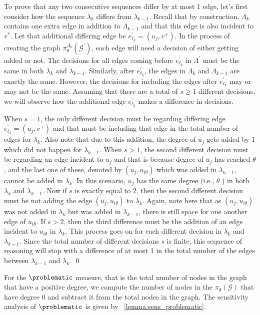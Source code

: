 To prove that any two consecutive sequences differ by at most 1 edge, let's first consider how the sequence $\lambda_k$ differs from $\lambda_{k-1}$. Recall that by construction, $\Lambda_k$ contains one extra edge in addition to $\Lambda_{k-1}$ and that this edge is also incident to $v^*$. Let that additional differing edge be $e_{\ell_k}^\prime = (u_j, v^+)$. In the process of creating the graph $\pi_\theta^{\Lambda_k}(\mathcal{G}^{\prime})$, each edge will need a decision of either getting added or not. The decisions for all edges coming before $e_{\ell_k}^{\prime}$ in $\Lambda^{\prime}$ must be the same in both $\lambda_k$ and $\lambda_{k-1}$. Similarly, after $e_{\ell_k}^{\prime}$, the edges in $\Lambda_k$ and $\Lambda_{k-1}$ are exactly the same. However, the decisions for including the edges after $e_{\ell_k}^{\prime}$ may or may not be the same. Assuming that there are a total of $s \geq 1$ different decisions, we will observe how the additional edge $e_{\ell_k}^{\prime}$ makes a difference in decisions. 


When $s=1$, the only different decision must be regarding differing edge $e_{\ell_k}^\prime = (u_j, v^+)$ and that must be including that edge in the total number of edges for $\lambda_k$. Also note that due to this addition, the degree of $u_j$ gets added by 1 which did not happen for $\lambda_{k-1}$. When $s>1$, the second different decision must be regarding an edge incident to $u_j$ and that is because degree of $u_j$ has reached $\theta$, and the last one of these, denoted by $(u_j, u_{i \theta})$ which was added in $\lambda_{k-1}$, cannot be added in $\lambda_k$. In this scenario, $u_j$ has the same degree (i.e., $\theta$ ) in both $\lambda_k$ and $\lambda_{k-1}$. Now if $s$ is exactly equal to 2, then the second different decision must be not adding the edge $(u_j, u_{i \theta})$ to $\lambda_k$. Again, note here that as $(u_j, u_{i \theta})$ was not added in $\lambda_k$ but was added in $\lambda_{k-1}$, there is still space for one another edge of $u_{i \theta}$. If $s>2$, then the third difference must be the addition of an edge incident to $u_{i \theta}$ in $\lambda_k$. This process goes on for each different decision in $\lambda_k$ and $\lambda_{k-1}$. Since the total number of different decisions $s$ is finite, this sequence of reasoning will stop with a difference of at most 1 in the total number of the edges between $\lambda_{k-1}$ and $\lambda_k$.
\qed
\fi

For the $\problematic$ measure, that is the total number of nodes in the graph that have a positive degree, we compute the number of nodes in the $\pi_\theta(\mathcal{G})$ that have degree 0 and subtract it from the total nodes in the graph. The sensitivity analysis of $\problematic$ is given by ~\cref{lemma:sens_problematic}. 

